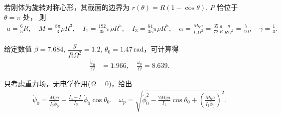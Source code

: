 \begin{exbox}
	若刚体为旋转对称心形，其截面的边界为 \(r (\theta) = R (1 - \cos \theta)\), \(P\) 恰位于 \(\theta = \pi\) 处，
	则
	\begin{align*}
		a = \frac{6}{5} R, \quad M = \frac{8 \pi}{3} \rho R^3, \quad I_1 = \frac{192}{35} \pi \rho R^5, \quad I_3 = \frac{64}{35} \pi \rho R^5,\quad
		\alpha = \frac{M g a}{I_1\Omega^2}
		= \frac{35}{72}\frac{a}{R}\frac{g}{R\Omega^2}
		= \frac{7}{10}, \quad \gamma = \frac{1}{3}.
	\end{align*}

	给定数值 \(\beta = 7.684,\, \dfrac{g}{R\Omega^2}=1.2,\, \theta_0=1.47\,\mathrm{rad}\)，可计算得
	\begin{align*}
		\frac{\dot{\psi}_0}{\Omega} & = 1.966, \quad \frac{\omega_p}{\Omega} = 8.639.
	\end{align*}
\end{exbox}

\begin{exbox}
	只考虑重力场，无电学作用(\(\Omega=0\))，给出
	\begin{align*}
		\dot{\psi}_0 = \frac{M g a}{I_3 \dot{\phi}_0} - \frac{I_3-I_1}{I_3}\dot{\phi}_0\cos \theta_0.\quad
		\omega_p=\sqrt{\dot{\phi}_0^2-\frac{2Mga}{I_1}\cos\theta_0+\left(\frac{Mga}{I_1\dot{\phi}_0}\right)^2}.
	\end{align*}
\end{exbox}

